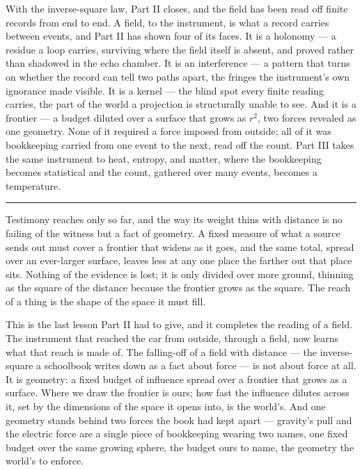 \bigskip

With the inverse-square law, Part II closes, and the field has been read off finite records from end to end. A
field, to the instrument, is what a record carries between events, and Part II has shown four of its faces. It
is a holonomy --- a residue a loop carries, surviving where the field itself is absent, and proved rather than
shadowed in the echo chamber. It is an interference --- a pattern that turns on whether the record can tell two
paths apart, the fringes the instrument's own ignorance made visible. It is a kernel --- the blind spot every
finite reading carries, the part of the world a projection is structurally unable to see. And it is a frontier
--- a budget diluted over a surface that grows as $r^2$, two forces revealed as one geometry. None of it
required a force imposed from outside; all of it was bookkeeping carried from one event to the next, read off
the count. Part III takes the same instrument to heat, entropy, and matter, where the bookkeeping becomes
statistical and the count, gathered over many events, becomes a temperature.

\bigskip
\begin{center}
\rule{0.4\textwidth}{0.4pt}
\end{center}
\bigskip

\noindent Testimony reaches only so far, and the way its weight thins with distance is no failing of the
witness but a fact of geometry. A fixed measure of what a source sends out must cover a frontier that widens as
it goes, and the same total, spread over an ever-larger surface, leaves less at any one place the farther out
that place sits. Nothing of the evidence is lost; it is only divided over more ground, thinning as the square of
the distance because the frontier grows as the square. The reach of a thing is the shape of the space it must
fill.

This is the last lesson Part II had to give, and it completes the reading of a field. The instrument that
reached the car from outside, through a field, now learns what that reach is made of. The falling-off of a
field with distance --- the inverse-square a schoolbook writes down as a fact about force --- is not about force
at all. It is geometry: a fixed budget of influence spread over a frontier that grows as a surface. Where we
draw the frontier is ours; how fast the influence dilutes across it, set by the dimensions of the space it
opens into, is the world's. And one geometry stands behind two forces the book had kept apart --- gravity's
pull and the electric force are a single piece of bookkeeping wearing two names, one fixed budget over the same
growing sphere, the budget ours to name, the geometry the world's to enforce.

